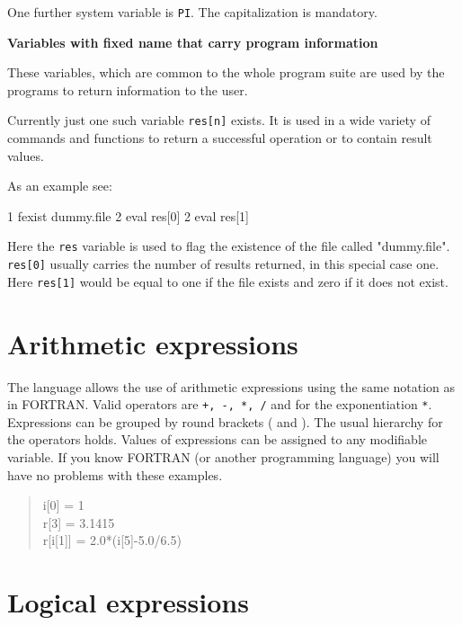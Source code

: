 One further system variable is {\tt PI}. The capitalization is mandatory.

{\bf Variables with fixed name that carry program information}

These variables, which are common to the whole program suite are 
used by the programs to return information to the user.

Currently just one such variable {\tt res[n]} exists. It is used
in a wide variety of commands and functions to return a successful
operation or to contain result values.

As an example see:
%
\begin{MacVerbatim}
   1  fexist dummy.file
   2  eval res[0]
   2  eval res[1]
\end{MacVerbatim}
%
Here the {\tt res} variable is used to flag the existence of the file
called "dummy.file". {\tt res[0]} usually carries the number of 
results returned, in this special case one. Here {\tt res[1]} would
be equal to one if the file exists and zero if it does not exist.



\section{Arithmetic expressions \label{arith-exp}}

The language allows the use of arithmetic expressions using the same
notation as in FORTRAN. Valid operators are {\tt +, -, *, /} and
for the exponentiation {\tt **}. Expressions can be grouped by 
round brackets ( and ). The
usual hierarchy for the operators holds. Values of expressions can
be assigned to any modifiable variable. If you know FORTRAN (or
another programming language) you will have no problems with these
examples.

\begin{quote}
  i[0] = 1 \\
  r[3] = 3.1415 \\
  r[i[1]] = 2.0*(i[5]-5.0/6.5)
\end{quote}


\section{Logical expressions \label{log-exp}}

